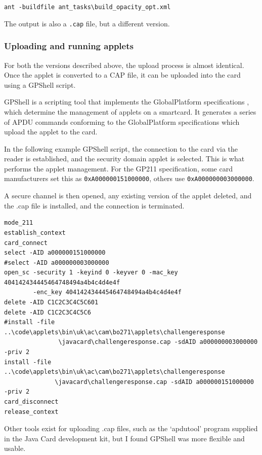 \documentclass[12pt,a4paper]{article}
\begin{document}
\verb|ant -buildfile ant_tasks\build_opacity_opt.xml|

The output is also a \verb|.cap| file, but a different version.

\subsubsection{Uploading and running applets}
For both the versions described above, the upload process is almost identical. Once the applet is converted to a CAP file, it can be uploaded into the card using a GPShell script.

GPShell \cite{gpshell} is a scripting tool that implements the GlobalPlatform specifications \cite{globalplatform}, which determine the management of applets on a smartcard. It generates a series of APDU commands conforming to the GlobalPlatform specifications which upload the applet to the card.

In the following example GPShell script, the connection to the card via the reader is established, and the security domain applet is selected. This is what performs the applet management. For the GP211 specification, some card manufacturers set this as \verb|0xA000000151000000|, others use \verb|0xA000000003000000|.

A secure channel is then opened, any existing version of the applet deleted, and the .cap file is installed, and the connection is terminated.
\begin{verbatim}
mode_211
establish_context
card_connect
select -AID a000000151000000
#select -AID a000000003000000
open_sc -security 1 -keyind 0 -keyver 0 -mac_key 404142434445464748494a4b4c4d4e4f 
        -enc_key 404142434445464748494a4b4c4d4e4f
delete -AID C1C2C3C4C5C601
delete -AID C1C2C3C4C5C6
#install -file ..\code\applets\bin\uk\ac\cam\bo271\applets\challengeresponse
               \javacard\challengeresponse.cap -sdAID a000000003000000 -priv 2
install -file ..\code\applets\bin\uk\ac\cam\bo271\applets\challengeresponse
              \javacard\challengeresponse.cap -sdAID a000000151000000 -priv 2
card_disconnect
release_context
\end{verbatim}


Other tools exist for uploading .cap files, such as the `apdutool' program supplied in the Java Card development kit, but I found GPShell was more flexible and usable.
\end{document}
